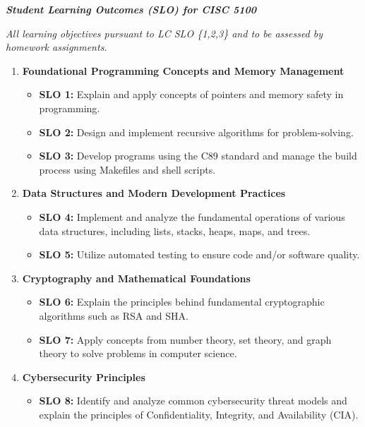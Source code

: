 \documentclass[11pt]{article}
\begin{document}
\textbf{\textit{Student Learning Outcomes (SLO) for CISC 5100}}

\textit{All learning objectives pursuant to LC SLO \{1,2,3\} and to be assessed by homework assignments.}

\begin{enumerate}
    \item \textbf{Foundational Programming Concepts and Memory Management}
        \begin{itemize}
            \item \textbf{SLO 1:} Explain and apply concepts of pointers and memory safety in programming.
            \item \textbf{SLO 2:} Design and implement recursive algorithms for problem-solving.
            \item \textbf{SLO 3:} Develop programs using the C89 standard and manage the build process using Makefiles and shell scripts.
        \end{itemize}
    \item \textbf{Data Structures and Modern Development Practices}
        \begin{itemize}
            \item \textbf{SLO 4:} Implement and analyze the fundamental operations of various data structures, including lists, stacks, heaps, maps, and trees.
            \item \textbf{SLO 5:} Utilize automated testing to ensure code and/or software quality.
        \end{itemize}
    \item \textbf{Cryptography and Mathematical Foundations}
        \begin{itemize}
            \item \textbf{SLO 6:} Explain the principles behind fundamental cryptographic algorithms such as RSA and SHA.
            \item \textbf{SLO 7:} Apply concepts from number theory, set theory, and graph theory to solve problems in computer science.
        \end{itemize}
    \item \textbf{Cybersecurity Principles}
        \begin{itemize}
            \item \textbf{SLO 8:} Identify and analyze common cybersecurity threat models and explain the principles of Confidentiality, Integrity, and Availability (CIA).
        \end{itemize}
\end{enumerate}
\end{document}
